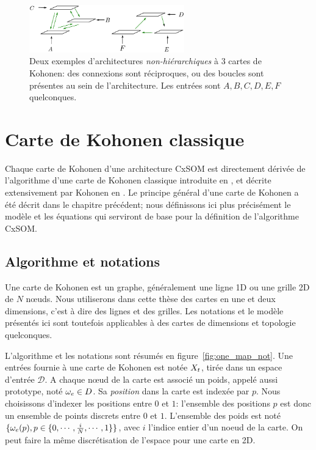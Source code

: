 \begin{figure}
\centering
\includegraphics[width=0.6\textwidth]{architecture.pdf}
\caption{Deux exemples d'architectures \emph{non-hiérarchiques} à 3 cartes de Kohonen: des connexions sont réciproques, ou des boucles sont présentes au sein de l'architecture.
Les entrées sont $A,B,C,D,E,F$ quelconques.}
\label{fig:archi_non_hierarchique}
\end{figure}


\section{Carte de Kohonen classique}\label{sec:kohonen}
Chaque carte de Kohonen d'une architecture CxSOM est directement dérivée de l'algorithme d'une carte de Kohonen classique introduite en \cite{Kohonen1982}, et décrite extensivement par Kohonen en \cite{Kohonen1995SelfOrganizingM}. Le principe général d'une carte de Kohonen a été décrit dans le chapitre précédent; nous définissons ici plus précisément le modèle et les équations qui serviront de base pour la définition de l'algorithme CxSOM.

\subsection{Algorithme et notations}
Une carte de Kohonen est un graphe, généralement une ligne 1D ou une grille 2D de $N$ n\oe{}uds. Nous utiliserons dans cette thèse des cartes en une et deux dimensions, c'est à dire des lignes et des grilles. Les notations et le modèle présentés ici sont toutefois applicables à des cartes de dimensions et topologie quelconques.

L'algorithme et les notations sont résumés en figure~\ref{fig:one_map_not}. Une entrées fournie à une carte de Kohonen est notée $X_t$, tirée dans un espace d'entrée $\mathcal{D}$. A chaque n\oe{}ud de la carte est associé un poids, appelé aussi prototype, noté $\omega_e \in D$. Sa \emph{position} dans la carte est indexée par $p$. Nous choisissons d'indexer les positions entre $0$ et $1$: l'ensemble des positions $p$ est donc un ensemble de points discrets entre $0$ et $1$. L'ensemble des poids est noté $\{\omega_e(p), p \in \{0,\cdots,\frac{i}{N}, \cdots, 1\}\}$, avec $i$ l'indice entier d'un noeud de la carte. On peut faire la même discrétisation de l'espace pour une carte en 2D.

